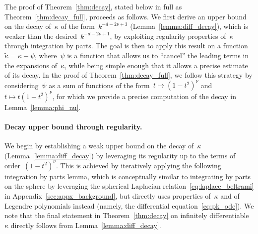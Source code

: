 
The proof of Theorem~\ref{thm:decay}, stated below in full as Theorem~\ref{thm:decay_full}, proceeds as follows.
We first derive an upper bound on the decay of~$\kappa$ of the form~$k^{-d-2 \nu + 3}$ (Lemma~\ref{lemma:diff_decay}), which is weaker than the desired~$k^{-d-2 \nu + 1}$, by exploiting regularity properties of~$\kappa$ through integration by parts.
The goal is then to apply this result on a function~$\tilde \kappa = \kappa - \psi$, where~$\psi$ is a function that allows us to ``cancel'' the leading terms in the expansions of~$\kappa$, while being simple enough that it allows a precise estimate of its decay.
In the proof of Theorem~\ref{thm:decay_full}, we follow this strategy by considering~$\psi$ as a sum of functions of the form~$t \mapsto (1 - t^2)^\nu$ and~$t \mapsto t(1 - t^2)^\nu$, for which we provide a precise computation of the decay in Lemma~\ref{lemma:phi_nu}.


\paragraph{Decay upper bound through regularity.}
We begin by establishing a weak upper bound on the decay of~$\kappa$ (Lemma~\ref{lemma:diff_decay}) by leveraging its regularity up to the terms of order~$(1 - t^2)^\nu$.
This is achieved by iteratively applying the following integration by parts lemma, which is conceptually similar to integrating by parts on the sphere by leveraging the spherical Laplacian relation~\eqref{eq:laplace_beltrami} in Appendix~\ref{sec:appx_background}, but directly uses properties of~$\kappa$ and of Legendre polynomials instead (namely, the differential equation~\eqref{eq:pk_ode}).
We note that the final statement in Theorem~\ref{thm:decay} on infinitely differentiable~$\kappa$ directly follows from Lemma~\ref{lemma:diff_decay}.

